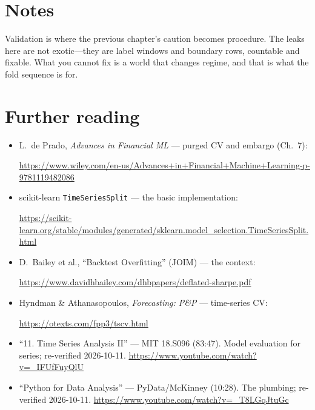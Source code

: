 \section*{Notes}
Validation is where the previous chapter's caution becomes procedure. The leaks here are
not exotic---they are label windows and boundary rows, countable and fixable. What you
cannot fix is a world that changes regime, and that is what the fold sequence is for.

\section*{Further reading}
\begin{itemize}
\item L.~de Prado, \emph{Advances in Financial ML} --- purged CV and embargo (Ch.~7):

\url{https://www.wiley.com/en-us/Advances+in+Financial+Machine+Learning-p-9781119482086}
\item scikit-learn \texttt{TimeSeriesSplit} --- the basic implementation:

\url{https://scikit-learn.org/stable/modules/generated/sklearn.model_selection.TimeSeriesSplit.html}
\item D.~Bailey et al., ``Backtest Overfitting'' (JOIM) --- the context:

\url{https://www.davidhbailey.com/dhbpapers/deflated-sharpe.pdf}
\item Hyndman \& Athanasopoulos, \emph{Forecasting: P\&P} --- time-series CV:

\url{https://otexts.com/fpp3/tscv.html}
\end{itemize}

\begin{rulebox}
\begin{itemize}
\item ``11. Time Series Analysis II'' --- MIT 18.S096 (83:47). Model evaluation for series;
re-verified 2026-10-11.
\url{https://www.youtube.com/watch?v=_IFUfFuyQlU}
\item ``Python for Data Analysis'' --- PyData/McKinney (10:28). The plumbing; re-verified
2026-10-11.
\url{https://www.youtube.com/watch?v=_T8LGqJtuGc}
\end{itemize}
\end{rulebox}

